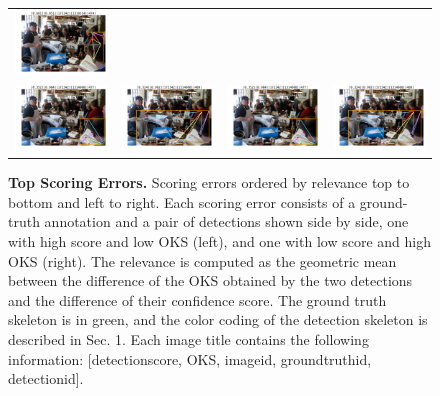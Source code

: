 \documentclass[10pt,onecolumn,letterpaper]{article}
\begin{document}
\begin{figure}[h!]
{\begin{tabular}{cc|cc}
\includegraphics[width=.2\linewidth,height=.15\paperwidth,keepaspectratio]{./result/rmpe/scoring_errors/score_err_4_high_oks.pdf}\\
\includegraphics[width=.2\linewidth,height=.15\paperwidth,keepaspectratio]{./result/rmpe/scoring_errors/score_err_5_high_score.pdf} &
\includegraphics[width=.2\linewidth,height=.15\paperwidth,keepaspectratio]{./result/rmpe/scoring_errors/score_err_5_high_oks.pdf} &
\includegraphics[width=.2\linewidth,height=.15\paperwidth,keepaspectratio]{./result/rmpe/scoring_errors/score_err_5_high_score.pdf} &
\includegraphics[width=.2\linewidth,height=.15\paperwidth,keepaspectratio]{./result/rmpe/scoring_errors/score_err_5_high_oks.pdf}\\
\end{tabular}
}
\vspace{-3mm}
\caption{ {\small \textbf{Top Scoring Errors.} Scoring errors ordered by relevance top to bottom and left to right.
Each scoring error consists of a ground-truth annotation and a pair of detections shown side by side, one with high score and low OKS (left),
and one with low score and high OKS (right).
The relevance is computed as the geometric mean between the difference of the OKS obtained
by the two detections and the difference of their confidence score.
The ground truth skeleton is in green, and the color coding of the detection skeleton is described in Sec. 1.
Each image title contains the following information:
[detection\textunderscore score, OKS, image\textunderscore id, ground\textunderscore truth\textunderscore id, detection\textunderscore id].}}
\end{figure}
\clearpage
\end{document}
